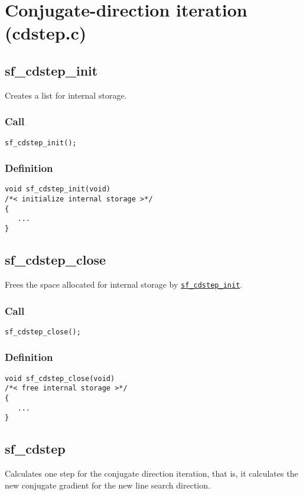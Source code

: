 \section{Conjugate-direction iteration (cdstep.c)}




\subsection{{sf\_cdstep\_init}}\label{sec:sf_cdstep_init}
Creates a list for internal storage.

\subsubsection*{Call}
\begin{verbatim}sf_cdstep_init();\end{verbatim}

\subsubsection*{Definition}
\begin{verbatim}
void sf_cdstep_init(void) 
/*< initialize internal storage >*/
{
   ...
}
\end{verbatim}




\subsection{{sf\_cdstep\_close}}
Frees the space allocated for internal storage by \hyperref[sec:sf_cdstep_init]{\texttt{sf\_cdstep\_init}}.

\subsubsection*{Call}
\begin{verbatim}sf_cdstep_close();\end{verbatim}

\subsubsection*{Definition}
\begin{verbatim}
void sf_cdstep_close(void) 
/*< free internal storage >*/
{
   ...
}
\end{verbatim}




\subsection{{sf\_cdstep}}\label{sec:sf_cdstep}
Calculates one step for the conjugate direction iteration, that is, it calculates the new conjugate gradient for the new line search direction.

